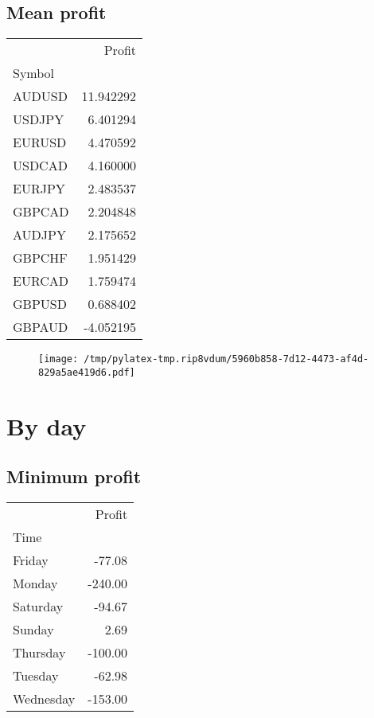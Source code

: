 \documentclass{article}%
\begin{document}
%
\newpage %
\subsection{Mean profit }%
\label{subsec:Meanprofit}%
\begin{tabular}{lr}
\toprule
{} &     Profit \\
Symbol &            \\
\midrule
AUDUSD &  11.942292 \\
USDJPY &   6.401294 \\
EURUSD &   4.470592 \\
USDCAD &   4.160000 \\
EURJPY &   2.483537 \\
GBPCAD &   2.204848 \\
AUDJPY &   2.175652 \\
GBPCHF &   1.951429 \\
EURCAD &   1.759474 \\
GBPUSD &   0.688402 \\
GBPAUD &  -4.052195 \\
\bottomrule
\end{tabular}
%


\begin{figure}[htbp]%
\centering%
\texttt{[image: /tmp/pylatex-tmp.rip8vdum/5960b858-7d12-4473-af4d-829a5ae419d6.pdf]}%
\end{figure}

%
\newpage %
\section{By day}%
\label{sec:Byday}%
\subsection{Minimum profit }%
\label{subsec:Minimumprofit}%
\begin{tabular}{lr}
\toprule
{} &  Profit \\
Time      &         \\
\midrule
Friday    &  -77.08 \\
Monday    & -240.00 \\
Saturday  &  -94.67 \\
Sunday    &    2.69 \\
Thursday  & -100.00 \\
Tuesday   &  -62.98 \\
Wednesday & -153.00 \\
\bottomrule
\end{tabular}
%
\end{document}
